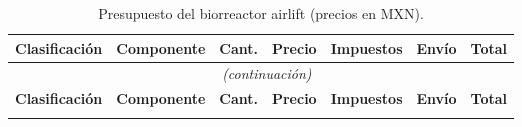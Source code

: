 \begingroup
\small
\renewcommand{\arraystretch}{1.25}
\begin{longtable}{@{} l p{4.8cm} c r r r r @{}}
\caption{Presupuesto del biorreactor airlift (precios en MXN).}
\label{tab:presupuesto} \\
\toprule
\textbf{Clasificación} & \textbf{Componente} & \textbf{Cant.} &
\textbf{Precio} & \textbf{Impuestos} & \textbf{Envío} & \textbf{Total} \\
\midrule
\endfirsthead

\multicolumn{7}{c}{\tablename~\thetable{} \textit{(continuación)}} \\[4pt]
\toprule
\textbf{Clasificación} & \textbf{Componente} & \textbf{Cant.} &
\textbf{Precio} & \textbf{Impuestos} & \textbf{Envío} & \textbf{Total} \\
\midrule
\endhead

\endfoot

\bottomrule
\endlastfoot


\end{longtable}

